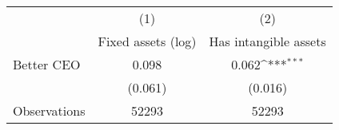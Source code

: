{
\def\sym#1{\ifmmode^{#1}\else\(^{#1}\)\fi}
\begin{tabular}{l*{2}{c}}
\hline\hline
                    &\multicolumn{1}{c}{(1)}&\multicolumn{1}{c}{(2)}\\
                    &\multicolumn{1}{c}{Fixed assets (log)}&\multicolumn{1}{c}{Has intangible assets}\\
\hline
Better CEO          &       0.098         &       0.062\sym{***}\\
                    &     (0.061)         &     (0.016)         \\
\hline
Observations        &       52293         &       52293         \\
\hline\hline
\end{tabular}
}
